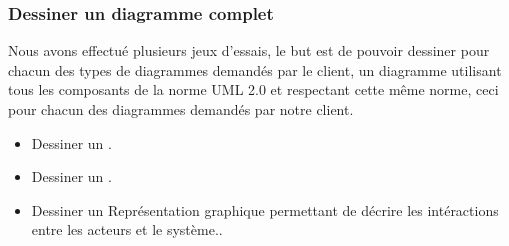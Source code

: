 \documentclass[12pt,a4paper,openany]{report}
\begin{document}
		\subsubsection{Dessiner un diagramme complet}
		Nous avons effectué plusieurs jeux d'essais, le but est de pouvoir dessiner pour chacun des types de diagrammes demandés par le client,
		un diagramme utilisant tous les composants de la norme UML 2.0 et respectant cette même norme, ceci pour chacun des diagrammes 
		demandés par notre client. 
		\begin{itemize}
			\item Dessiner un .
			\item Dessiner un .
			\item Dessiner un  {Représentation graphique permettant de décrire les intéractions entre les acteurs et le système.}.
		\end{itemize}
	
\end{document}
